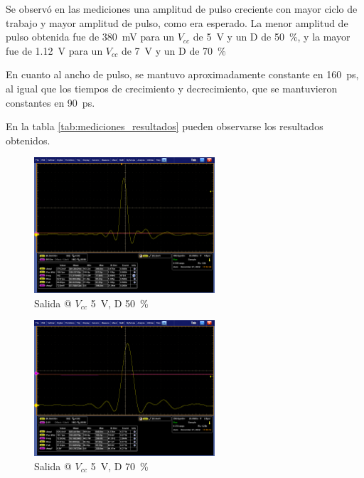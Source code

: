 Se observó en las mediciones una amplitud de pulso creciente con mayor ciclo de
trabajo y mayor amplitud de pulso, como era esperado. La menor amplitud de pulso
obtenida fue de \qty{380}{\milli\volt} para un $V_{cc}$ de \qty{5}{\volt} y un D
de \qty{50}{\percent}, y la mayor fue de \qty{1.12}{\volt} para un $V_{cc}$
de \qty{7}{\volt} y un D de \qty{70}{\percent}

En cuanto al ancho de pulso, se mantuvo aproximadamente constante en
\qty{160}{\pico\second}, al igual que los tiempos de crecimiento y
decrecimiento, que se mantuvieron constantes en \qty{90}{\pico\second}.

En la tabla \ref{tab:mediciones_resultados} pueden observarse los resultados obtenidos.

\begin{figure}
  \centering
    \includegraphics[width=0.6\textwidth]{images/mediciones/vcc_5v_duty_50.png}
    \caption{Salida @ $V_{cc}$ \qty{5}{\volt}, D \qty{50}{\percent} }
    \label{fig:mediciones_5v_50}
\end{figure}

\begin{figure}
  \centering
    \includegraphics[width=0.6\textwidth]{images/mediciones/vcc_5v_duty_70.png}
    \caption{Salida @ $V_{cc}$ \qty{5}{\volt}, D \qty{70}{\percent} }
    \label{fig:mediciones_5v_70}
\end{figure}

